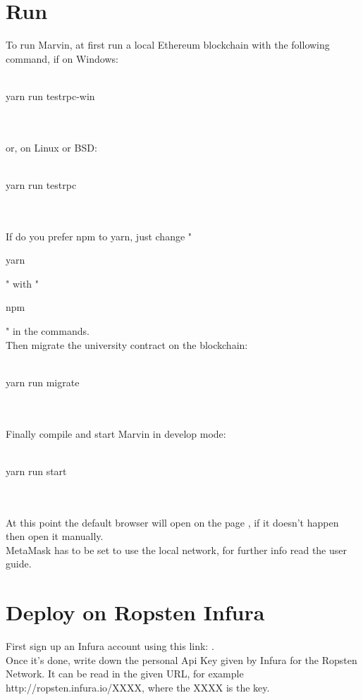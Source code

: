 \documentclass[ManualeSviluppatore]{subfiles}
\begin{document}
\section{Run}
To run Marvin, at first run a local Ethereum blockchain with the following command, if on Windows: \\\\
\begin{ttfamily} \indent yarn run testrpc-win \end{ttfamily} \\\\
or, on Linux or BSD: \\\\
\begin{ttfamily} \indent yarn run testrpc \end{ttfamily} \\\\
If do you prefer npm to yarn, just change "\begin{ttfamily}yarn\end{ttfamily}" with "\begin{ttfamily}npm\end{ttfamily}" in the commands.\\
Then migrate the university contract on the blockchain: \\\\
\begin{ttfamily} \indent yarn run migrate \end{ttfamily} \\\\
Finally compile and start Marvin in develop mode: \\\\
\begin{ttfamily} \indent yarn run start \end{ttfamily} \\\\

At this point the default browser will open on the page , if it doesn't happen then open it manually.\\
MetaMask has to be set to use the local network, for further info read the user guide.

\section{Deploy on Ropsten Infura}
First sign up an Infura account using this link: . \\
Once it's done, write down the personal Api Key given by Infura for the Ropsten Network. It can be read in the given URL, for example http://ropsten.infura.io/XXXX, where the XXXX is the key. \\
\end{document}
